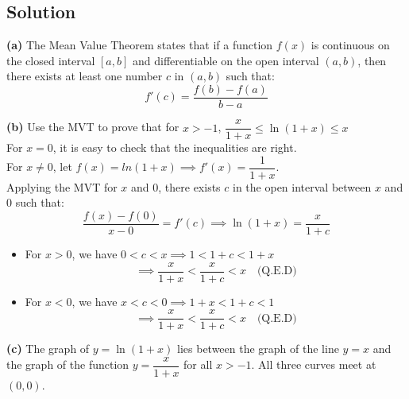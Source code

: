 \subsection*{Solution}
\textbf{(a)} The Mean Value Theorem states that if a function $f(x)$ is continuous on the closed interval $[a, b]$ and differentiable on the open interval $(a, b)$, then there exists at least one number $c$ in $(a, b)$ such that:
$$f'(c) = \frac{f(b) - f(a)}{b - a}$$

\textbf{(b)} Use the MVT to prove that for $x > -1$, $\dfrac{x}{1+x} \le \ln(1+x) \le x$\\
For $x=0$, it is easy to check that the inequalities are right.
\\
For $x\neq 0$, let $f(x) = ln(1+x) \implies f'(x) = \dfrac{1}{1+x}$. 
\\Applying the MVT for $x$ and $0$, there exists $c$ in the open interval between $x$ and $0$ such that:
$$\frac{f(x) - f(0)}{x - 0} = f'(c) \implies \ln(1+x) = \frac{x}{1+c} $$

\begin{itemize}
\item For $x>0$, we have $0<c<x \implies 1<1+c<1+x$ $$\implies \frac{x}{1+x}<\frac{x}{1+c}<x \quad \text{(Q.E.D)}$$
\item For $x<0$, we have $x<c<0 \implies 1+x<1+c<1$ $$\implies \frac{x}{1+x}<\frac{x}{1+c}<x \quad \text{(Q.E.D)}$$
\end{itemize}

\textbf{(c)}
The graph of $y = \ln(1+x)$ lies between the graph of the line $y = x$ and the graph of the function $y = \dfrac{x}{1+x}$ for all $x > -1$. All three curves meet at $(0, 0)$.
\begin{center}
\end{center}



